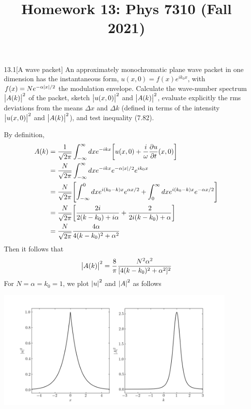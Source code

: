 \documentclass[12pt]{article}
\title{Homework 13: Phys 7310 (Fall 2021)}
\begin{document}
\maketitle
\begin{problem}{13.1}[A wave packet]
An approximately monochromatic plane wave packet in one dimension has the
instantaneous form, $u(x,0)=f(x)e^{ik_0x}$, with $f(x)=Ne^{-\alpha\abs{x}/2}$
the modulation envelope. Calculate the wave-number spectrum $\abs{A(k)}^2$ of
the packet, sketch $\abs{u(x,0)}^2$ and $\abs{A(k)}^2$, evaluate explicitly the
rms deviations from the means $\Delta x$ and $\Delta k$ (defined in terms of the
intensity $\abs{u(x,0)}^2$ and $\abs{A(k)}^2$), and test inequality (7.82).
\begin{solution}
By definition,
\begin{align}
    A(k)
    &=\frac1{\sqrt{2\pi}}\int_{-\infty}^\infty dx
    e^{-ikx}\qty[u(x,0)+\frac{i}{\omega}\frac{\partial u}{\partial
    t}(x,0)]\notag\\
    &=\frac{N}{\sqrt{2\pi}}\int_{-\infty}^\infty
    dxe^{-ikx}e^{-\alpha\abs{x}/2}e^{ik_0x}\notag\\
    &=\frac{N}{\sqrt{2\pi}}\qty[\int_{-\infty}^0dxe^{i(k_0-k)x}e^{\alpha
    x/2}+\int_0^\infty dxe^{i(k_0-k)x}e^{-\alpha x/2}]\notag\\
    &=\frac{N}{\sqrt{2\pi}}\qty[\frac{2i}{2(k-k_0)+i\alpha}+\frac{2}{2i(k-k_0)+\alpha}]\notag\\
    &=\frac{N}{\sqrt{2\pi}}\frac{4\alpha}{4(k-k_0)^2+\alpha^2}
\end{align}
Then it follows that
\begin{align}
    \abs{A(k)}^2=\frac8\pi\frac{N^2\alpha^2}{[4(k-k_0)^2+\alpha^2]^2} 
\end{align}
For $N=\alpha=k_0=1$, we plot $\abs{u}^2$ and $\abs{A}^2$ as follows
\begin{center}
    \includegraphics[width=0.9\textwidth]{p1.png} 
\end{center}


\end{solution}
\end{problem}
\end{document}
